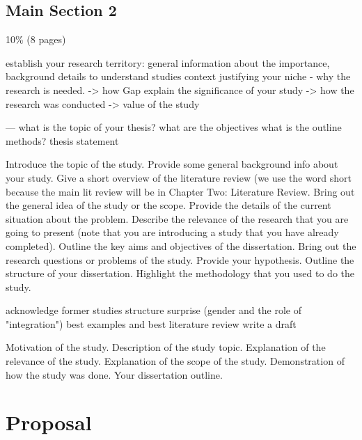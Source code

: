 \section{Main Section 2}

10\% (8 pages)

establish your research territory: general information about the importance, background details to understand studies context
justifying your niche - why the research is needed. -> how Gap
explain the significance of your study -> how the research was conducted -> value of the study

---
what is the topic of your thesis?
what are the objectives
what is the outline
methods?
thesis statement

Introduce the topic of the study.
Provide some general background info about your study.
Give a short overview of the literature review (we use the word short because the main lit review will be in Chapter Two: Literature Review.
Bring out the general idea of the study or the scope.
Provide the details of the current situation about the problem.
Describe the relevance of the research that you are going to present (note that you are introducing a study that you have already completed).
Outline the key aims and objectives of the dissertation.
Bring out the research questions or problems of the study.
Provide your hypothesis.
Outline the structure of your dissertation.
Highlight the methodology that you used to do the study.


acknowledge former studies
structure 
surprise (gender and the role of "integration")
best examples and best literature review
write a draft

Motivation of the study.
Description of the study topic.
Explanation of the relevance of the study.
Explanation of the scope of the study.
Demonstration of how the study was done.
Your dissertation outline.




\chapter{Proposal} %

\label{Proposal} %

\newcommand{\keyword}[1]{\textbf{\#1}}
\newcommand{\tabhead}[1]{\textbf{\#1}}
\newcommand{\code}[1]{\texttt{\#1}}
\newcommand{\file}[1]{\texttt{\bfseries\#1}}
\newcommand{\option}[1]{\texttt{\itshape\#1}}

